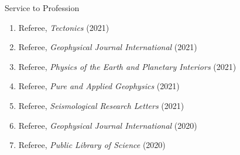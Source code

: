 \begin{rSection}{Service to Profession}
	\begin{enumerate}
		\item Referee, \textit{Tectonics} (2021)
		\item Referee, \textit{Geophysical Journal International} (2021)
		\item Referee, \textit{Physics of the Earth and Planetary Interiors} (2021)
		\item Referee, \textit{Pure and Applied Geophysics} (2021)
		\item Referee, \textit{Seismological Research Letters} (2021)
		\item Referee, \textit{Geophysical Journal International} (2020)
		\item Referee, \textit{Public Library of Science} (2020)
	\end{enumerate}
\end{rSection}
